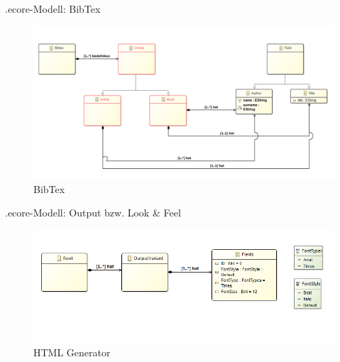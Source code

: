 \documentclass[fleqn,11pt,aspectratio=43]{beamer}
\begin{document}
\begin{frame}{.ecore-Modell: BibTex}
\begin{figure}
\includegraphics[scale=0.28]{../Images/FirstBibtexEcore.png} 
\caption{BibTex}
\end{figure}  
\end{frame}

\begin{frame}{.ecore-Modell: Output bzw. Look \& Feel}
\begin{figure}
\includegraphics[scale=0.5]{../Images/FirstBibtexToHTMLEcore.png} 
\caption{HTML Generator}
\end{figure}   
\end{frame}
\end{document}
